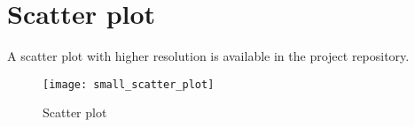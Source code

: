 \documentclass[\main/main.tex]{subfiles}
\begin{document}
\section{Scatter plot}
A scatter plot with higher resolution is available in the project repository.
\begin{figure}
  \texttt{[image: small\_scatter\_plot]}
  \caption{Scatter plot}
\end{figure}
\end{document}
